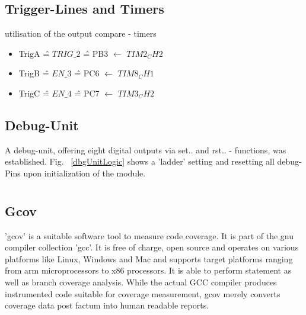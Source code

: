 \documentclass[master,english,smartquotes,apa]{hgbthesis}
\begin{document}
		\subsection{Trigger-Lines and Timers}
		utilisation of the output compare - timers
		\begin{itemize}
			\item TrigA \^{=} $TRIG\_2$  \^{=} PB3 $\leftarrow$ $TIM2_CH2$
			\item TrigB \^{=} $EN\_3$    \^{=} PC6 $\leftarrow$ $TIM8_CH1$
			\item TrigC \^{=} $EN\_4$    \^{=} PC7 $\leftarrow$ $TIM3_CH2$
		\end{itemize}
		\subsection{Debug-Unit}
		A debug-unit, offering eight digital outputs via set.. and rst.. - functions, was established. Fig. ~\ref{dbgUnitLogic} shows a 'ladder' setting and resetting all debug-Pins upon initialization of the module.
		

		
		

		\section{}
			\subsection{}
			\subsection{Gcov}
				'gcov' is a suitable software tool to measure code coverage. It is part of the gnu compiler collection 'gcc'. It is free of charge, open source and operates on various platforms like Linux, Windows and Mac and supports target platforms ranging from arm microprocessors to x86 processors. It is able to perform statement as well as branch coverage analysis. While the actual GCC compiler produces instrumented code suitable for coverage measurement, gcov merely converts coverage data post factum into human readable reports.
\end{document}

